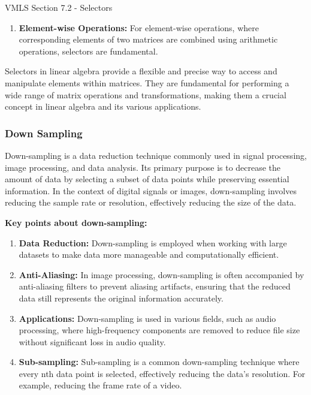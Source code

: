 \begin{notes}{VMLS Section 7.2 - Selectors}
\begin{enumerate}
        \item \textbf{Element-wise Operations:} For element-wise operations, where corresponding elements of two matrices are combined using arithmetic operations, selectors are fundamental.
    \end{enumerate}

    Selectors in linear algebra provide a flexible and precise way to access and manipulate elements within matrices. They are fundamental for performing a wide range of matrix operations and 
    transformations, making them a crucial concept in linear algebra and its various applications.

    \subsubsection*{Down Sampling}

    Down-sampling is a data reduction technique commonly used in signal processing, image processing, and data analysis. Its primary purpose is to decrease the amount of data by selecting a 
    subset of data points while preserving essential information. In the context of digital signals or images, down-sampling involves reducing the sample rate or resolution, effectively reducing 
    the size of the data. \vspace*{1em}

    \textbf{Key points about down-sampling:}

    \begin{enumerate}
        \item \textbf{Data Reduction:} Down-sampling is employed when working with large datasets to make data more manageable and computationally efficient.
        
        \item \textbf{Anti-Aliasing:} In image processing, down-sampling is often accompanied by anti-aliasing filters to prevent aliasing artifacts, ensuring that the reduced data still 
        represents the original information accurately.
        
        \item \textbf{Applications:} Down-sampling is used in various fields, such as audio processing, where high-frequency components are removed to reduce file size without significant 
        loss in audio quality.
        
        \item \textbf{Sub-sampling:} Sub-sampling is a common down-sampling technique where every nth data point is selected, effectively reducing the data's resolution. For example, reducing 
        the frame rate of a video.
        

\end{enumerate}
\end{notes}
